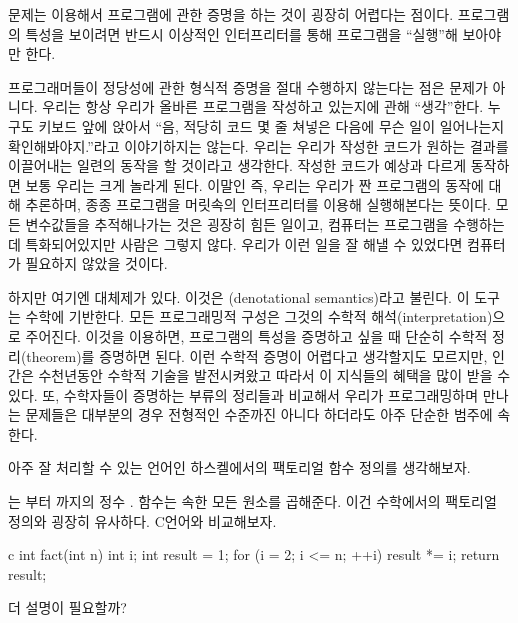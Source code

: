 문제는  이용해서 프로그램에 관한 증명을 하는 것이 굉장히 어렵다는 점이다. 프로그램의 특성을 보이려면 반드시 이상적인 인터프리터를 통해 프로그램을 ``실행''해 보아야만 한다.

프로그래머들이 정당성에 관한 형식적 증명을 절대 수행하지 않는다는 점은 문제가 아니다. 우리는 항상 우리가 올바른 프로그램을 작성하고 있는지에 관해 ``생각''한다.
누구도 키보드 앞에 앉아서 ``음, 적당히 코드 몇 줄 쳐넣은 다음에 무슨 일이 일어나는지 확인해봐야지.''라고 이야기하지는 않는다.
우리는 우리가 작성한 코드가 원하는 결과를 이끌어내는 일련의 동작을 할 것이라고 생각한다. 작성한 코드가 예상과 다르게 동작하면 보통 우리는 크게 놀라게 된다.
이말인 즉, 우리는 우리가 짠 프로그램의 동작에 대해 추론하며, 종종 프로그램을 머릿속의 인터프리터를 이용해 실행해본다는 뜻이다.
모든 변수값들을 추적해나가는 것은 굉장히 힘든 일이고, 컴퓨터는 프로그램을 수행하는데 특화되어있지만 사람은 그렇지 않다.
우리가 이런 일을 잘 해낼 수 있었다면 컴퓨터가 필요하지 않았을 것이다.

하지만 여기엔 대체제가 있다. 이것은 \newTerm{\trDenotationalSemantics}(denotational semantics)라고 불린다. 이 도구는 수학에 기반한다.
 모든 프로그래밍적 구성은 그것의 수학적 해석(interpretation)으로 주어진다.
이것을 이용하면, 프로그램의 특성을 증명하고 싶을 때 단순히 수학적 정리(theorem)를 증명하면 된다.
이런 수학적 증명이 어렵다고 생각할지도 모르지만, 인간은 수천년동안 수학적 기술을 발전시켜왔고 따라서 이 지식들의 혜택을 많이 받을 수 있다.
또, 수학자들이 증명하는 부류의 정리들과 비교해서 우리가 프로그래밍하며 만나는 문제들은 대부분의 경우 전형적인 수준까진 아니다 하더라도 아주 단순한 범주에 속한다.

 아주 잘 처리할 수 있는 언어인 하스켈에서의 팩토리얼 함수 정의를 생각해보자. 


\trExpression \code{{[}1..n{]}} 는  부터 까지의 정수 .   함수는  속한 모든 원소를 곱해준다. 이건 수학에서의 팩토리얼 정의와 굉장히 유사하다. C언어와 비교해보자.

\begin{snip}{c}
int fact(int n) {
    int i;
    int result = 1;
    for (i = 2; i <= n; ++i)
        result *= i;
    return result;
}
\end{snip}

더 설명이 필요할까?

